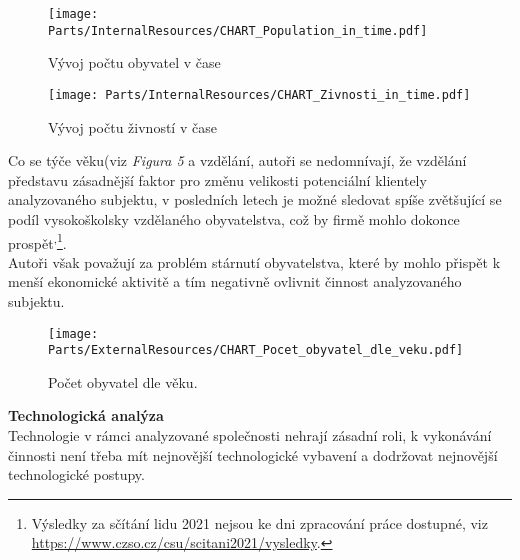 \begin{figure}[!hbtp]
	\centering
	\texttt{[image: Parts/InternalResources/CHART\_Population\_in\_time.pdf]}
	\caption[Vývoj počtu obyvatel v čase]{Vývoj počtu obyvatel v čase}
	\label{fig:Vyvoj poctu obyvatel v case}
\end{figure}

\newpage

\begin{figure}[!hbtp]
	\centering
	\texttt{[image: Parts/InternalResources/CHART\_Zivnosti\_in\_time.pdf]}
	\caption[Vývoj počtu živností v čase]{Vývoj počtu živností v čase}
	\label{fig:Vyvoj poctu zivnosti v case}
\end{figure}

Co se týče věku(viz \textit{Figura 5} a vzdělání, autoři se nedomnívají, že vzdělání představu zásadnější faktor pro změnu velikosti potenciální klientely analyzovaného subjektu, v posledních letech je možné sledovat spíše zvětšující se podíl vysokoškolsky vzdělaného obyvatelstva, což by firmě mohlo dokonce prospět\textsuperscript{,}\footnote{Výsledky za sčítání lidu 2021 nejsou ke dni zpracování práce dostupné, viz \url{https://www.czso.cz/csu/scitani2021/vysledky}.}.\\

Autoři však považují za problém stárnutí obyvatelstva, které by mohlo přispět k menší ekonomické aktivitě a tím negativně ovlivnit činnost analyzovaného subjektu.\\

\newpage

\begin{figure}[!hbtp]
	\centering
	\texttt{[image: Parts/ExternalResources/CHART\_Pocet\_obyvatel\_dle\_veku.pdf]}
	\caption[Počet obyvatel dle věku]{Počet obyvatel dle věku.}
	\label{fig:Pocet obyvatel dle veku}
\end{figure}




\noindent\textbf{Technologická analýza}\\

Technologie v rámci analyzované společnosti nehrají zásadní roli, k vykonávání činnosti není třeba mít nejnovější technologické vybavení a dodržovat nejnovější technologické postupy.\\

